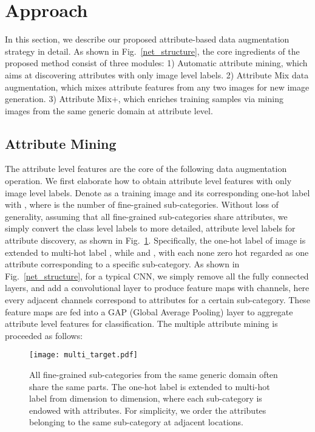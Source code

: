 \documentclass[runningheads]{llncs}
\begin{document}
\section{Approach}
\noindent In this section, we describe our proposed attribute-based data augmentation strategy in detail. As shown in Fig.~\ref{net_structure}, the core ingredients of the proposed method consist of three modules: 1) Automatic attribute mining, which aims at discovering attributes with only image level labels. 2) Attribute Mix data augmentation, which mixes attribute features from any two images for new image generation. 3) Attribute Mix+, which enriches training samples via mining images from the same generic domain at attribute level.

\subsection{Attribute Mining}
\noindent The attribute level features are the core of the following data augmentation operation. We first elaborate how to obtain attribute level features with only image level labels. Denote  as a training image and its corresponding one-hot label with , where  is the number of fine-grained sub-categories. Without loss of generality, assuming that all fine-grained sub-categories share  attributes, we simply convert the  class level labels to more detailed,  attribute level labels for attribute discovery, as shown in Fig.~\ref{convert_label}. Specifically, the one-hot label  of image  is extended to multi-hot label , while  and , with each none zero hot regarded as one attribute corresponding to a specific sub-category. As shown in Fig.~\ref{net_structure}, for a typical CNN, we simply remove all the fully connected layers, and add a  convolutional layer to produce feature maps  with  channels, here every adjacent  channels correspond to  attributes for a certain sub-category. These feature maps are fed into a GAP (Global Average Pooling) layer to aggregate attribute level features for classification. The multiple attribute mining is proceeded as follows:

\begin{figure}[t]
  \centering
  \texttt{[image: multi\_target.pdf]}
  \vspace{-0.2cm}
  \caption{All fine-grained sub-categories from the same generic domain often share the same parts. The one-hot label is extended to multi-hot label from  dimension to  dimension, where each sub-category is endowed with  attributes. For simplicity, we order the attributes belonging to the same sub-category at adjacent locations.}\label{convert_label}
  \vspace{-0.2cm}
\end{figure}
\end{document}
